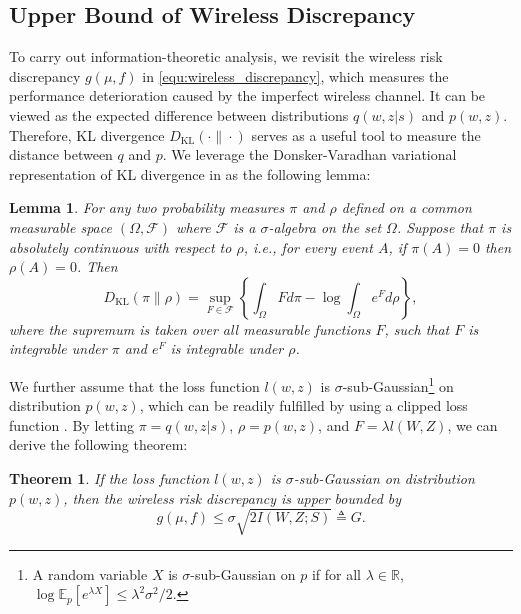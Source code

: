 \documentclass[lettersize,journal]{IEEEtran}
\newcommand{\R}{\mathbb{R}}
\newcommand{\E}{\mathbb{E}}
\theoremstyle{definition}
\theoremstyle{plain}
\newtheorem{theorem}{Theorem}
\newtheorem{lemma}{Lemma}
\begin{document}
\subsection{Upper Bound of Wireless Discrepancy}
\label{sec:upper_bound}
To carry out information-theoretic analysis, we revisit the wireless risk discrepancy $g(\mu,f)$ in \cref{equ:wireless_discrepancy}, which measures the performance deterioration caused by the imperfect wireless channel. It can be viewed as the expected difference between distributions $q(w, z | s)$ and $p(w,z)$.
Therefore, KL divergence $D_{\text{KL}}(\cdot\|\cdot)$ serves as a useful tool to measure the distance between $q$ and $p$.
We leverage the Donsker-Varadhan variational representation of KL divergence in \cite{KL-divergence-variant} as the following lemma:
\begin{lemma}
\label{thm:KL_divergence}
For any two probability measures $\pi$ and $\rho$ defined on a common measurable space $(\Omega,\mathcal{F})$ where $\mathcal{F}$ is a $\sigma$-algebra on the set $\Omega$. Suppose that $\pi$ is absolutely continuous with respect to $\rho$, i.e., for every event $A$, if $\pi(A)=0$ then $\rho(A)=0$. Then
\begin{equation}
    \label{equ:KL_divergence}
    D_{\text{KL}}(\pi\|\rho) = \sup_{F\in\mathcal{F}}\left\{\int_\Omega F d\pi - \log \int_\Omega e^F d\rho\right\},
\end{equation}
where the supremum is taken over all measurable functions $F$, such that $F$ is integrable under $\pi$ and $e^F$ is integrable under $\rho$.
\end{lemma}

We further assume that the loss function $l(w,z)$ is $\sigma$-sub-Gaussian\footnote{A random variable $X$ is $\sigma$-sub-Gaussian on $p$ if for all $\lambda\in\R$, $\log\E_p\left[e^{\lambda X}\right]\leq \lambda^2\sigma^2/2$.} on distribution $p(w,z)$, which can be readily fulfilled by using a clipped loss function \cite{sub-Gaussian} \cite{information-theoretic}. 
By letting $\pi=q(w, z | s)$, $\rho=p(w,z)$, and $F = \lambda l(W,Z)$, we can derive the following theorem:

\begin{theorem}%
    \label{thm:upper_bound}
    If the loss function $l(w,z)$ is $\sigma$-sub-Gaussian on distribution $p(w,z)$, then the wireless risk discrepancy is upper bounded by
    \begin{equation}
        \label{equ:upper_bound}
        g(\mu,f) \leq \sigma \sqrt{2I(W,Z;S)} \triangleq G.
    \end{equation}
\end{theorem}
\end{document}
